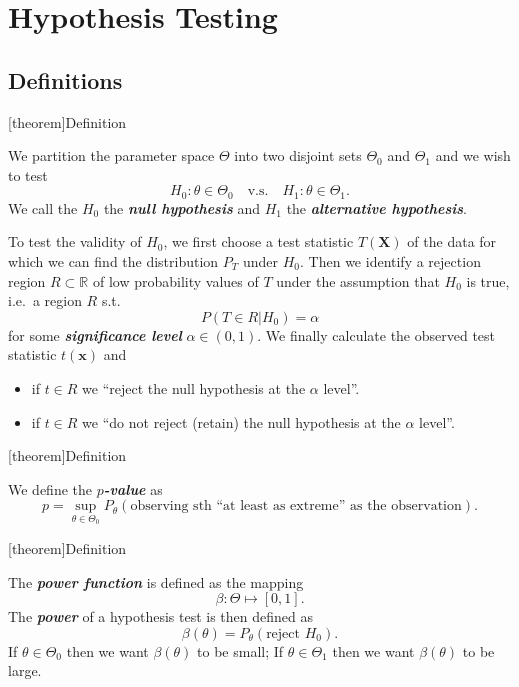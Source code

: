 \documentclass[12pt]{report}
\theoremstyle{definition}
\begin{document}
\chapter{Hypothesis Testing}

\section{Definitions}

[theorem]{Definition}
\begin{null vs alternative hypothesis}
    We partition the parameter space $\Theta$ into two disjoint sets $\Theta_0$
    and $\Theta_1$ and we wish to test
    \[
        H_0:\theta\in\Theta_0 \quad\text{v.s.}\quad 
        H_1:\theta\in\Theta_1.
    \]
    We call the $H_0$ the \textbf{\emph{null hypothesis}} and $H_1$ the
    \textbf{\emph{alternative hypothesis}}.

    \medskip
    To test the validity of $H_0$, we first choose a test statistic
    $T(\mathbf{X})$ of the data for which we can find the distribution $P_T$
    under $H_0$. Then we identify a rejection region $R\subset\mathbb{R}$ of low
    probability values of $T$ under the assumption that $H_0$ is true, i.e.\ a
    region $R$ s.t.
    \[
        P(T\in R|H_0)=\alpha
    \]
    for some \textbf{\emph{significance level}} $\alpha\in(0,1)$. We finally
    calculate the observed test statistic $t(\mathbf{x})$ and
    \begin{itemize}
        \item if $t\in R$ we ``reject the null hypothesis at the $\alpha$
            level''.
        \item if $t\in R$ we ``do not reject (retain) the null hypothesis at the
            $\alpha$ level''.
    \end{itemize} 
\end{null vs alternative hypothesis}

[theorem]{Definition}
\begin{p value}
    We define the \textbf{\emph{$p$-value}} as
    \[
        p=\underset{\theta\in\Theta_0}{\sup}P_\theta(\text{observing sth ``at
        least as extreme'' as the observation}).
    \]
\end{p value}

[theorem]{Definition}
\begin{power of a test}
    The \textbf{\emph{power function}} is defined as the mapping
    \[
        \beta:\Theta\mapsto[0,1].
    \]
    The \textbf{\emph{power}} of a hypothesis test is then defined as\[
        \beta(\theta)=P_\theta(\text{reject }H_0).
    \]
    If $\theta\in\Theta_0$  then we want $\beta(\theta)$ to be small;
    If $\theta\in\Theta_1$  then we want $\beta(\theta)$ to be large.
\end{power of a test}
\end{document}
